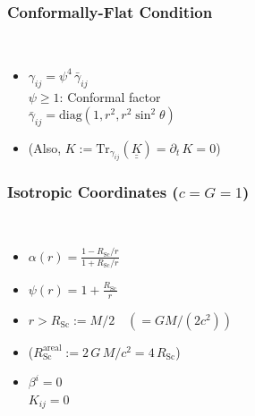 \documentclass{beamer}
\newcommand{\p}{\partial}
\newcommand{\ul}{\underline}
\newcommand{\rsc}{R_{\mathrm{Sc}}}
\begin{document}
\begin{frame}
\frametitle{Conformally-Flat Condition}

  \citet{wmm1996,cc2009}\\[1em]

  \begin{itemize}[<+->]
    \item[]
      $\gamma_{ij}=\psi^{4}\,\bar{\gamma}_{ij}$\\[1em]
      $\psi\geq1$: Conformal factor\\[1em]
      $\bar{\gamma}_{ij}
      =\mathrm{diag}\left(1,r^{2},r^{2}\sin^{2}\theta\right)$\\[1em]
    \item[]
      (Also, $K:=\mathrm{Tr}_{\gamma_{ij}}\left(\ul{\ul{K}}\right)=\p_{t}\,K=0$)
  \end{itemize}

\end{frame}

\begin{frame}
\frametitle{Isotropic Coordinates ($c=G=1$)}

  \citet{bs2010}\\[1em]

  \begin{itemize}[<+->]
    \item[]
      $\alpha\left(r\right)=
      \frac{1-\rsc/r}{1+\rsc/r}$\\[1em]
    \item[]
      $\psi\left(r\right)=
      1+\frac{\rsc}{r}$\\[1em]
    \item[]
      $r>\rsc:=M/2\hspace{1em}\left(=GM/\left(2c^{2}\right)\right)$\\[1em]
    \item[]
      ($\rsc^{\mathrm{areal}}:=2\,G\,M/c^{2}=4\,\rsc$)\\[1em]
    \item[]
      $\beta^{i}=0$\\[1em]
      $K_{ij}=0$
  \end{itemize}

\end{frame}
\end{document}

